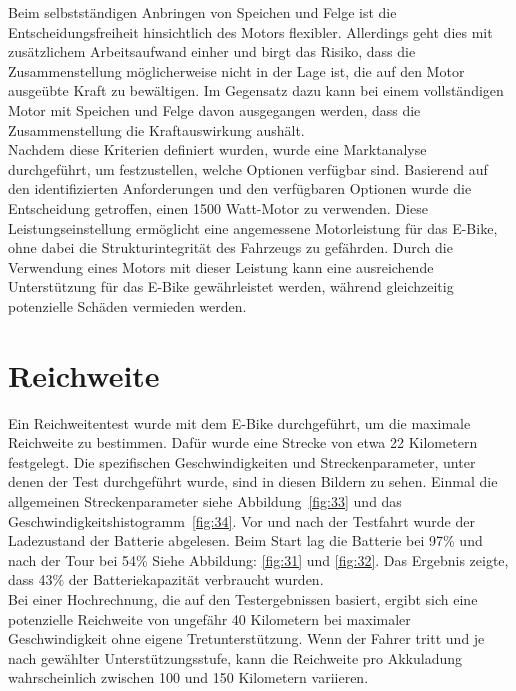 Beim selbstständigen Anbringen von Speichen und Felge ist die Entscheidungsfreiheit hinsichtlich des Motors flexibler.
Allerdings geht dies mit zusätzlichem Arbeitsaufwand einher und birgt das Risiko, dass die Zusammenstellung möglicherweise nicht in der Lage ist, die auf den Motor ausgeübte Kraft zu bewältigen.
Im Gegensatz dazu kann bei einem vollständigen Motor mit Speichen und Felge davon ausgegangen werden, dass die Zusammenstellung die Kraftauswirkung aushält.\\

Nachdem diese Kriterien definiert wurden, wurde eine Marktanalyse durchgeführt, um festzustellen, welche Optionen verfügbar sind.
Basierend auf den identifizierten Anforderungen und den verfügbaren Optionen wurde die Entscheidung getroffen, einen 1500 Watt-Motor zu verwenden.
Diese Leistungseinstellung ermöglicht eine angemessene Motorleistung für das E-Bike, ohne dabei die Strukturintegrität des Fahrzeugs zu gefährden.
Durch die Verwendung eines Motors mit dieser Leistung kann eine ausreichende Unterstützung für das E-Bike gewährleistet werden, während gleichzeitig potenzielle Schäden vermieden werden.\\


\section{Reichweite}

Ein Reichweitentest wurde mit dem E-Bike durchgeführt, um die maximale Reichweite zu bestimmen.
Dafür wurde eine Strecke von etwa 22 Kilometern festgelegt.
Die spezifischen Geschwindigkeiten und Streckenparameter, unter denen der Test durchgeführt wurde, sind in diesen Bildern zu sehen. 
Einmal die allgemeinen Streckenparameter siehe Abbildung~\ref{fig:33} und das Geschwindigkeitshistogramm~\ref{fig:34}.
Vor und nach der Testfahrt wurde der Ladezustand der Batterie abgelesen.
Beim Start lag die Batterie bei 97\% und nach der Tour bei 54\% Siehe Abbildung: \ref{fig:31} und \ref{fig:32}.
Das Ergebnis zeigte, dass 43\% der Batteriekapazität verbraucht wurden.\\

Bei einer Hochrechnung, die auf den Testergebnissen basiert, ergibt sich eine potenzielle Reichweite von ungefähr 40 Kilometern bei maximaler Geschwindigkeit ohne eigene Tretunterstützung.
Wenn der Fahrer tritt und je nach gewählter Unterstützungsstufe, kann die Reichweite pro Akkuladung wahrscheinlich zwischen 100 und 150 Kilometern variieren.








